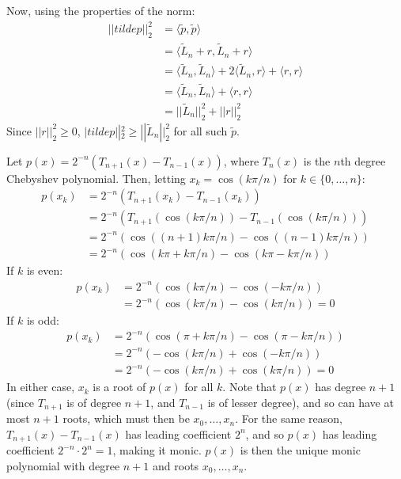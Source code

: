 \documentclass{article}
\begin{document}
Now, using the properties of the norm:
\begin{align*}
    ||tilde{p}||_2^2 & = \langle \tilde{p}, \tilde{p}\rangle \\
    & = \langle\tilde{L}_n + r, \tilde{L}_n + r\rangle \\
    & = \langle\tilde{L}_n, \tilde{L}_n\rangle + 2\langle\tilde{L}_n, r\rangle + \langle r, r\rangle \\
    & = \langle\tilde{L}_n, \tilde{L}_n\rangle + \langle r, r\rangle \\
    & = ||\tilde{L}_n||_2^2 + ||r||_2^2
\end{align*}
Since $||r||_2^2 \geq 0$, $|tilde{p}||_2^2 \geq ||\tilde{L}_n||_2^2$ for all such $\tilde{p}$.

\clearpage
\problem{}
Let $p(x) = 2^{-n}(T_{n+1}(x) - T_{n-1}(x))$, where $T_n(x)$ is the $n$th degree Chebyshev polynomial. Then, letting $x_k = \cos(k\pi/n)$ for $k \in \{0, \ldots, n\}$:
\begin{align*}
    p(x_k) & = 2^{-n}(T_{n+1}(x_k) - T_{n-1}(x_k)) \\
    & = 2^{-n}(T_{n+1}(\cos(k\pi/n)) - T_{n-1}(\cos(k\pi/n))) \\
    & = 2^{-n}(\cos((n + 1)k\pi/n) - \cos((n - 1)k\pi/n)) \\
    & = 2^{-n}(\cos(k\pi + k\pi/n) - \cos(k\pi - k\pi/n))
\end{align*}
If $k$ is even:
\begin{align*}
    p(x_k) & = 2^{-n}(\cos(k\pi/n) - \cos(- k\pi/n)) \\
    & = 2^{-n}(\cos(k\pi/n) - \cos(k\pi/n)) = 0
\end{align*}
If $k$ is odd:
\begin{align*}
    p(x_k) & = 2^{-n}(\cos(\pi + k\pi/n) - \cos(\pi - k\pi/n)) \\
    & = 2^{-n}(-\cos(k\pi/n) + \cos(-k\pi/n)) \\
    & = 2^{-n}(-\cos(k\pi/n) + \cos(k\pi/n)) = 0
\end{align*}
In either case, $x_k$ is a root of $p(x)$ for all $k$. Note that $p(x)$ has degree $n + 1$ (since $T_{n+1}$ is of degree $n + 1$, and $T_{n-1}$ is of lesser degree), and so can have at most $n + 1$ roots, which must then be $x_0, \ldots, x_n$. For the same reason, $T_{n+1}(x) - T_{n-1}(x)$ has leading coefficient $2^n$, and so $p(x)$ has leading coefficient $2^{-n} \cdot 2^n = 1$, making it monic. $p(x)$ is then the unique monic polynomial with degree $n + 1$ and roots $x_0, \ldots, x_n$.
\end{document}
